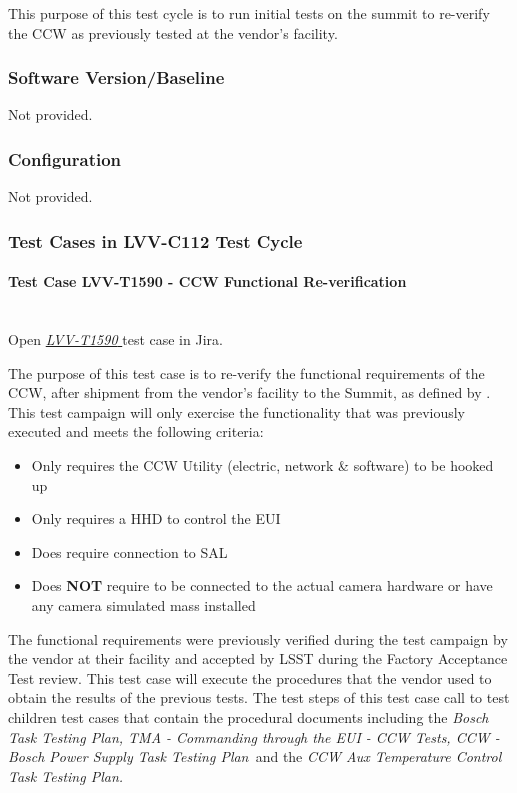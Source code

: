 \documentclass[SE,lsstdraft,STR,toc]{lsstdoc}
\providecommand{\tightlist}{
  \setlength{\itemsep}{0pt}\setlength{\parskip}{0pt}}
\begin{document}
 This purpose of this test cycle is to run initial tests on the summit to
re-verify the CCW as previously tested at the vendor's facility.


\subsubsection{Software Version/Baseline}
Not provided.

\subsubsection{Configuration}
Not provided.

\subsubsection{Test Cases in LVV-C112 Test Cycle}

\paragraph{Test Case LVV-T1590 -  CCW Functional Re-verification
 }\mbox{}\\

Open  \href{https://jira.lsstcorp.org/secure/Tests.jspa#/testCase/LVV-T1590}{\textit{ LVV-T1590 } }
test case in Jira.

 The purpose of this test case is to re-verify the functional
requirements of the CCW, after shipment from the vendor's facility to
the Summit, as defined by . This test campaign will only exercise
the functionality that was previously executed and meets the following
criteria:

\begin{itemize}
\tightlist
\item
  Only requires the CCW Utility (electric, network \& software) to be
  hooked up
\item
  Only requires a HHD to control the EUI
\item
  Does require connection to SAL
\item
  Does \textbf{NOT} require to be connected to the actual camera
  hardware or have any camera simulated mass installed
\end{itemize}

The functional requirements were previously verified during the test
campaign by the vendor at their facility and accepted by LSST during the
Factory Acceptance Test review. This test case will execute the
procedures that the vendor used to obtain the results of the previous
tests. The test steps of this test case call to test children test cases
that contain the procedural documents including the \emph{Bosch Task
Testing Plan, TMA - Commanding through the EUI - CCW Tests, CCW - Bosch
Power Supply Task Testing Plan~}and the \emph{CCW Aux Temperature
Control Task Testing Plan.}\\[2\baselineskip]
\end{document}
